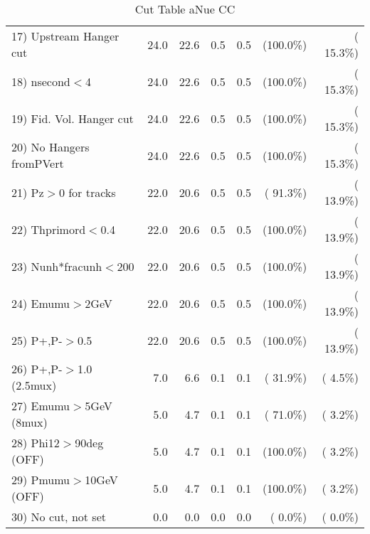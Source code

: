 \begin{table}[h!]
\begin{tabular}{||l||r|r|r|r|r|r||}
 17) Upstream Hanger cut  &         24.0 &         22.6 &          0.5 &          0.5 & (100.0\%) & ( 15.3\%) \\
 18) nsecond$<$4          &         24.0 &         22.6 &          0.5 &          0.5 & (100.0\%) & ( 15.3\%) \\
 19) Fid. Vol. Hanger cut &         24.0 &         22.6 &          0.5 &          0.5 & (100.0\%) & ( 15.3\%) \\
 20) No Hangers fromPVert &         24.0 &         22.6 &          0.5 &          0.5 & (100.0\%) & ( 15.3\%) \\
 21) Pz$>$0 for tracks    &         22.0 &         20.6 &          0.5 &          0.5 & ( 91.3\%) & ( 13.9\%) \\
 22) Thprimord$<$0.4      &         22.0 &         20.6 &          0.5 &          0.5 & (100.0\%) & ( 13.9\%) \\
 23) Nunh*fracunh$<$200   &         22.0 &         20.6 &          0.5 &          0.5 & (100.0\%) & ( 13.9\%) \\
 24) Emumu$>$2GeV         &         22.0 &         20.6 &          0.5 &          0.5 & (100.0\%) & ( 13.9\%) \\
 25) P+,P-$>$0.5          &         22.0 &         20.6 &          0.5 &          0.5 & (100.0\%) & ( 13.9\%) \\
 26) P+,P-$>$1.0 (2.5mux) &          7.0 &          6.6 &          0.1 &          0.1 & ( 31.9\%) & (  4.5\%) \\
 27) Emumu$>$5GeV  (8mux) &          5.0 &          4.7 &          0.1 &          0.1 & ( 71.0\%) & (  3.2\%) \\
 28) Phi12$>$90deg  (OFF) &          5.0 &          4.7 &          0.1 &          0.1 & (100.0\%) & (  3.2\%) \\
 29) Pmumu$>$10GeV  (OFF) &          5.0 &          4.7 &          0.1 &          0.1 & (100.0\%) & (  3.2\%) \\
 30) No cut, not set      &          0.0 &          0.0 &          0.0 &          0.0 & (  0.0\%) & (  0.0\%) \\
 \hline
 \hline
 \end{tabular}
 \caption{Cut Table  aNue CC  }
 \label{tab-cutheavy_neutrino_3.000}
 \end{table}

